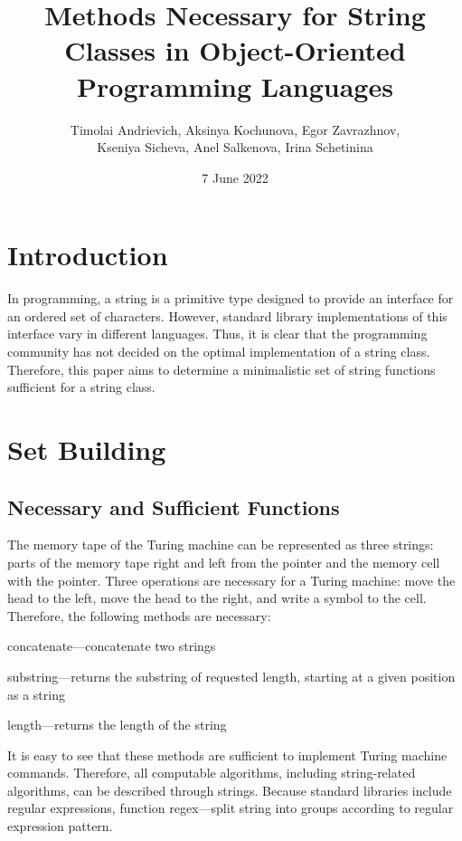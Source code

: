 \documentclass[11pt,nonacm,natbib=false]{acmart}
\title{Methods Necessary for String Classes in Object-Oriented Programming Languages}
\author{
Timolai Andrievich, 
 Aksinya Kochunova, 
 Egor Zavrazhnov, \\
 Kseniya Sicheva, 
 Anel Salkenova, 
 Irina Schetinina 
}
\date{7 June 2022}
\affil{Innopolis University}
\begin{document}
\maketitle

\section{Introduction}
In programming, a string is a primitive type designed to provide an interface for an ordered set of characters. However, standard library implementations of this interface vary in different languages. Thus, it is clear that the programming community has not decided on the optimal implementation of a string class. Therefore, this paper aims to determine a minimalistic set of string functions sufficient for a string class.

\section{Set Building}
\subsection{Necessary and Sufficient Functions}
The memory tape of the Turing machine can be represented as three strings: parts of the memory tape right and left from the pointer and the memory cell with the pointer. Three operations are necessary for a Turing machine: move the head to the left, move the head to the right, and write a symbol to the cell. Therefore, the following methods are necessary:
\begin{inparaenum}
    \item concatenate---concatenate two strings
    \item substring---returns the substring of requested length, starting at a given position as a string
    \item length---returns the length of the string
\end{inparaenum}
It is easy to see that these methods are sufficient to implement Turing machine commands. Therefore, all computable algorithms, including string-related algorithms, can be described through strings. Because standard libraries include regular expressions, function regex---split string into groups according to regular expression pattern.
\end{document}
